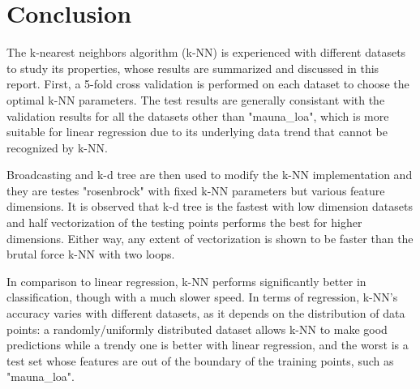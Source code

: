 \documentclass{article} %
\begin{document}
\section*{Conclusion} %
The k-nearest neighbors algorithm (k-NN) is experienced with different datasets to study its properties, whose results are summarized and discussed in this report. First, a 5-fold cross validation is performed on each dataset to choose the optimal k-NN parameters. The test results are generally consistant with the validation results for all the datasets other than "mauna\_loa", which is more suitable for linear regression due to its underlying data trend that cannot be recognized by k-NN.

Broadcasting and k-d tree are then used to modify the k-NN implementation and they are testes "rosenbrock" with fixed k-NN parameters but various feature dimensions. It is observed that k-d tree is the fastest with low dimension datasets and half vectorization of the testing points performs the best for higher dimensions. Either way, any extent of vectorization is shown to be faster than the brutal force k-NN with two loops.

In comparison to linear regression, k-NN performs significantly better in classification, though with a much slower speed. In terms of regression, k-NN's accuracy varies with different datasets, as it depends on the distribution of data points: a randomly/uniformly distributed dataset allows k-NN to make good predictions while a trendy one is better with linear regression, and the worst is a test set whose features are out of the boundary of the training points, such as "mauna\_loa".
\end{document}
